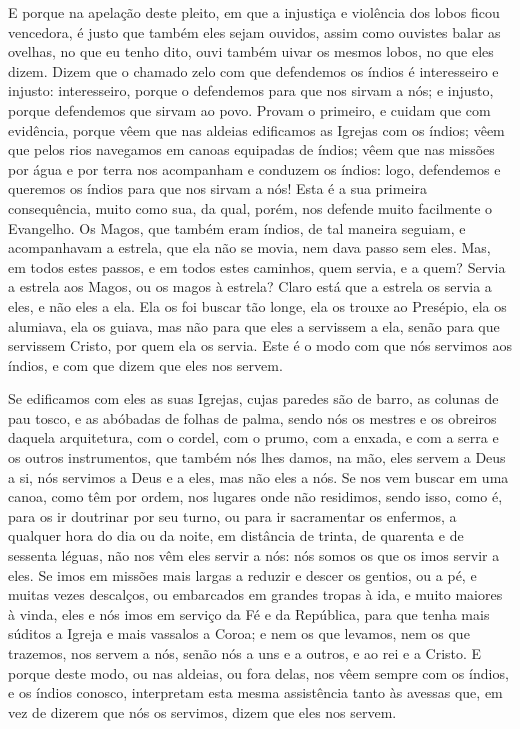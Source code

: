 E porque na apelação deste pleito, em que a injustiça e violência dos
lobos ficou vencedora, é justo que também eles sejam ouvidos, assim como
ouvistes balar as ovelhas, no que eu tenho dito, ouvi também uivar os
mesmos lobos, no que eles dizem. Dizem que o chamado zelo com que
defendemos os índios é interesseiro e injusto: interesseiro, porque o
defendemos para que nos sirvam a nós; e injusto, porque defendemos que
sirvam ao povo. Provam o primeiro, e cuidam que com evidência, porque
vêem que nas aldeias edificamos as Igrejas com os índios; vêem que pelos
rios navegamos em canoas equipadas de índios; vêem que nas missões por
água e por terra nos acompanham e conduzem os índios: logo, defendemos e
queremos os índios para que nos sirvam a nós! Esta é a sua primeira
consequência, muito como sua, da qual, porém, nos defende muito
facilmente o Evangelho. Os Magos, que também eram índios, de tal maneira
seguiam, e acompanhavam a estrela, que ela não se movia, nem dava passo
sem eles. Mas, em todos estes passos, e em todos estes caminhos, quem
servia, e a quem? Servia a estrela aos Magos, ou os magos à estrela?
Claro está que a estrela os servia a eles, e não eles a ela. Ela os foi
buscar tão longe, ela os trouxe ao Presépio,
ela os alumiava, ela os guiava, mas não para que eles a servissem a ela,
senão para que servissem Cristo, por quem ela os servia. Este é o modo
com que nós servimos aos índios, e com que dizem que eles nos servem.

Se edificamos com eles as suas Igrejas, cujas paredes são de barro, as
colunas de pau tosco, e as abóbadas de folhas de palma, sendo nós os
mestres e os obreiros daquela arquitetura, com o cordel, com o prumo,
com a enxada, e com a serra e os outros instrumentos, que também nós
lhes damos, na mão, eles servem a Deus a si, nós servimos a Deus e a
eles, mas não eles a nós. Se nos vem buscar em uma canoa, como têm por
ordem, nos lugares onde não residimos, sendo isso, como é, para os ir
doutrinar por seu turno, ou para ir sacramentar os enfermos, a qualquer
hora do dia ou da noite, em distância de trinta, de quarenta e de
sessenta léguas, não nos vêm eles servir a nós: nós somos os que os imos
servir a eles. Se imos em missões mais largas a reduzir e descer os
gentios, ou a pé, e muitas vezes descalços, ou embarcados em grandes
tropas à ida, e muito maiores à vinda, eles e nós imos em serviço da Fé
e da República, para que tenha mais súditos a Igreja e mais vassalos a
Coroa; e nem os que levamos, nem os que trazemos, nos servem a nós,
senão nós a uns e a outros, e ao rei e a Cristo. E porque deste modo, ou
nas aldeias, ou fora delas, nos vêem sempre com os índios, e os índios
conosco, interpretam esta mesma assistência tanto às avessas que, em vez
de dizerem que nós os servimos, dizem que eles nos servem.

